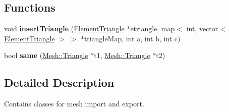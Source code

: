 \subsection*{Functions}
\begin{DoxyCompactItemize}
\item 
\hypertarget{namespacemesh_a7bbc91fbef6a7fc95c0366f750f19247}{
void {\bfseries insertTriangle} (\hyperlink{structmesh_1_1_element_triangle}{ElementTriangle} $\ast$etriangle, map$<$ int, vector$<$ \hyperlink{structmesh_1_1_element_triangle}{ElementTriangle} $>$ $>$ $\ast$triangleMap, int a, int b, int c)}
\label{namespacemesh_a7bbc91fbef6a7fc95c0366f750f19247}

\item 
\hypertarget{namespacemesh_ad92e832aa6b0f9297d2f4e5405790f39}{
bool {\bfseries same} (\hyperlink{structmesh_1_1_mesh_1_1_triangle}{Mesh::Triangle} $\ast$t1, \hyperlink{structmesh_1_1_mesh_1_1_triangle}{Mesh::Triangle} $\ast$t2)}
\label{namespacemesh_ad92e832aa6b0f9297d2f4e5405790f39}

\end{DoxyCompactItemize}


\subsection{Detailed Description}
Contains classes for mesh import and export. 
